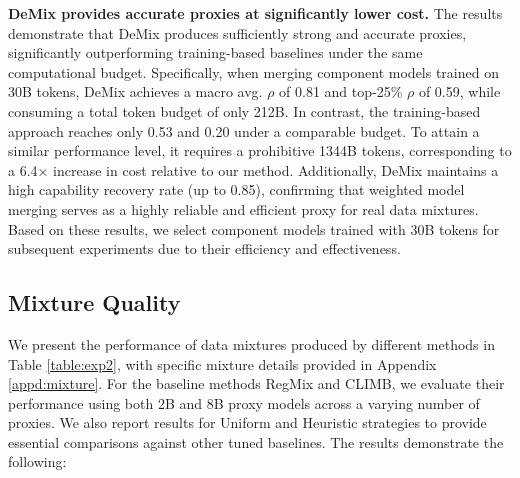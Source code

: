 \documentclass{article}
\theoremstyle{plain}
\theoremstyle{definition}
\theoremstyle{remark}
\begin{document}
\textbf{DeMix provides accurate proxies at significantly lower cost.} 
The results demonstrate that DeMix produces sufficiently strong and accurate proxies, significantly outperforming training-based baselines under the same computational budget. Specifically, when merging component models trained on 30B tokens, DeMix achieves a macro avg. $\rho$ of 0.81 and top‑25\% $\rho$ of 0.59, while consuming a total token budget of only 212B.
In contrast, the training-based approach reaches only 0.53 and 0.20 under a comparable budget. To attain a similar performance level, it requires a prohibitive 1344B tokens, corresponding to a 6.4× increase in cost relative to our method.
Additionally, DeMix maintains a high capability recovery rate (up to 0.85), confirming that weighted model merging serves as a highly reliable and efficient proxy for real data mixtures. Based on these results, we select component models trained with 30B tokens for subsequent experiments due to their efficiency and effectiveness.



\subsection{Mixture Quality}

We present the performance of data mixtures produced by different methods in Table \ref{table:exp2}, with specific mixture details provided in Appendix \ref{appd:mixture}. For the baseline methods RegMix and CLIMB, we evaluate their performance using both 2B and 8B proxy models across a varying number of proxies. We also report results for Uniform and Heuristic strategies to provide essential comparisons against other tuned baselines. The results demonstrate the following:
\end{document}
